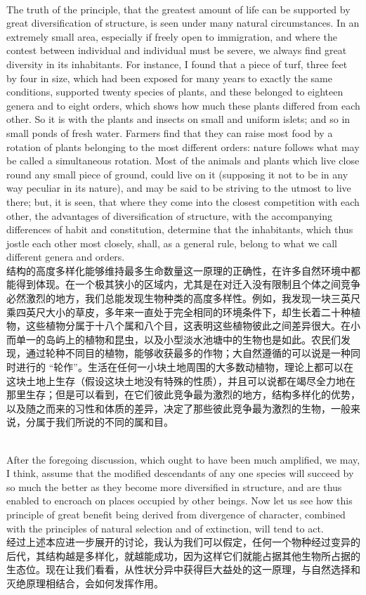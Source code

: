 \documentclass{article}
\begin{document}
\\
The truth of the principle, that the greatest amount of life can be supported by great diversification of structure, is seen under many natural circumstances. In an extremely small area, especially if freely open to immigration, and where the contest between individual and individual must be severe, we always find great diversity in its inhabitants. For instance, I found that a piece of turf, three feet by four in size, which had been exposed for many years to exactly the same conditions, supported twenty species of plants, and these belonged to eighteen genera and to eight orders, which shows how much these plants differed from each other. So it is with the plants and insects on small and uniform islets; and so in small ponds of fresh water. Farmers find that they can raise most food by a rotation of plants belonging to the most different orders: nature follows what may be called a simultaneous rotation. Most of the animals and plants which live close round any small piece of ground, could live on it (supposing it not to be in any way peculiar in its nature), and may be said to be striving to the utmost to live there; but, it is seen, that where they come into the closest competition with each other, the advantages of diversification of structure, with the accompanying differences of habit and constitution, determine that the inhabitants, which thus jostle each other most closely, shall, as a general rule, belong to what we call different genera and orders.\\
结构的高度多样化能够维持最多生命数量这一原理的正确性，在许多自然环境中都能得到体现。在一个极其狭小的区域内，尤其是在对迁入没有限制且个体之间竞争必然激烈的地方，我们总能发现生物种类的高度多样性。例如，我发现一块三英尺乘四英尺大小的草皮，多年来一直处于完全相同的环境条件下，却生长着二十种植物，这些植物分属于十八个属和八个目，这表明这些植物彼此之间差异很大。在小而单一的岛屿上的植物和昆虫，以及小型淡水池塘中的生物也是如此。农民们发现，通过轮种不同目的植物，能够收获最多的作物；大自然遵循的可以说是一种同时进行的 “轮作”。生活在任何一小块土地周围的大多数动植物，理论上都可以在这块土地上生存（假设这块土地没有特殊的性质），并且可以说都在竭尽全力地在那里生存；但是可以看到，在它们彼此竞争最为激烈的地方，结构多样化的优势，以及随之而来的习性和体质的差异，决定了那些彼此竞争最为激烈的生物，一般来说，分属于我们所说的不同的属和目。 

\\
After the foregoing discussion, which ought to have been much amplified, we may, I think, assume that the modified descendants of any one species will succeed by so much the better as they become more diversified in structure, and are thus enabled to encroach on places occupied by other beings. Now let us see how this principle of great benefit being derived from divergence of character, combined with the principles of natural selection and of extinction, will tend to act.\\
经过上述本应进一步展开的讨论，我认为我们可以假定，任何一个物种经过变异的后代，其结构越是多样化，就越能成功，因为这样它们就能占据其他生物所占据的生态位。现在让我们看看，从性状分异中获得巨大益处的这一原理，与自然选择和灭绝原理相结合，会如何发挥作用。 \\
\end{document}
